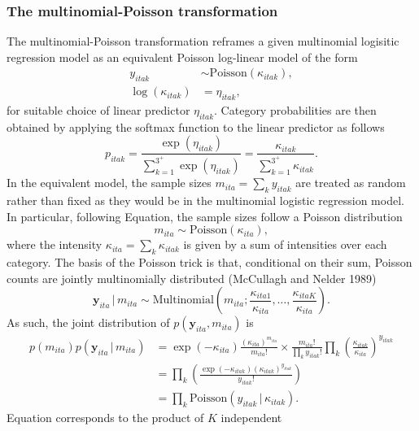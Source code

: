 \documentclass[
]{article}
\begin{document}
\hypertarget{the-multinomial-poisson-transformation}{%
\subsubsection{The multinomial-Poisson
transformation}\label{the-multinomial-poisson-transformation}}

The multinomial-Poisson transformation reframes a given multinomial
logisitic regression model as an equivalent Poisson log-linear model of
the form \begin{align}
    y_{itak} &\sim \text{Poisson}(\kappa_{itak}), \\
    \log(\kappa_{itak}) &= \eta_{itak},
\end{align} for suitable choice of linear predictor \(\eta_{itak}\).
Category probabilities are then obtained by applying the softmax
function to the linear predictor as follows \begin{equation}
    p_{itak} = \frac{\exp(\eta_{itak})}{\sum_{k = 1}^{3^{+}} \exp(\eta_{itak})} = \frac{\kappa_{itak}}{\sum_{k = 1}^{3^{+}} \kappa_{itak}}.
\end{equation} In the equivalent model, the sample sizes
\(m_{ita} = \sum_k y_{itak}\) are treated as random rather than fixed as
they would be in the multinomial logistic regression model. In
particular, following Equation, the sample sizes follow a Poisson
distribution \begin{equation}
    m_{ita} \sim \text{Poisson} \left( \kappa_{ita} \right),
\end{equation} where the intensity
\(\kappa_{ita} = \sum_k \kappa_{itak}\) is given by a sum of intensities
over each category. The basis of the Poisson trick is that, conditional
on their sum, Poisson counts are jointly multinomially distributed
(McCullagh and Nelder 1989) \begin{equation}
    \mathbf{y}_{ita} \, | \, m_{ita} \sim \text{Multinomial} \left( m_{ita}; \frac{\kappa_{ita1}}{\kappa_{ita}}, \ldots, \frac{\kappa_{itaK}}{\kappa_{ita}} \right).
\end{equation} As such, the joint distribution of
\(p(\mathbf{y}_{ita}, m_{ita})\) is \begin{align}
p(m_{ita}) p(\mathbf{y}_{ita} \, | \, m_{ita}) 
&= \exp(-\kappa_{ita}) \frac{(\kappa_{ita})^{m_{ita}}}{m_{ita}!} \times \frac{m_{ita}!}{\prod_k y_{itak}!} \prod_k \left( \frac{\kappa_{itak}}{\kappa_{ita}} \right)^{y_{itak}} \\
&= \prod_k \left( \frac{\exp(-\kappa_{itak}) \left( \kappa_{itak} \right)^{y_{itak}}}{y_{itak}!} \right) \\
&= \prod_k \text{Poisson} \left( y_{itak} \, | \, \kappa_{itak} \right). \label{eq:prodpoisson}
\end{align} Equation corresponds to the product of \(K\) independent
\end{document}
